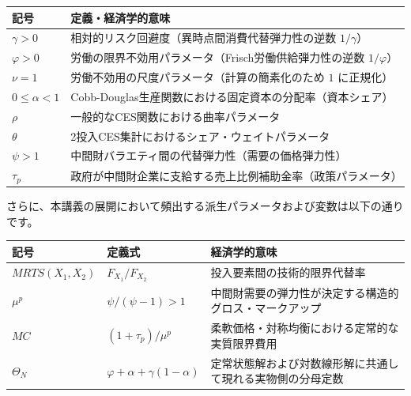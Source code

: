 \documentclass[
  japanese,
  lualatex,
  ja=standard,
  12pt,
  a4paper]{ltjsarticle}
\newcounter{none} %
\begin{document}
{\def\LTcaptype{none} %
\begin{longtable}[]{@{}
  >{\raggedright\arraybackslash}p{}
  >{\raggedright\arraybackslash}p{}@{}}
\toprule\noalign{}
\begin{minipage}[b]{\linewidth}\raggedright
記号
\end{minipage} & \begin{minipage}[b]{\linewidth}\raggedright
定義・経済学的意味
\end{minipage} \\
\midrule\noalign{}
\endhead
\bottomrule\noalign{}
\endlastfoot
\(\gamma > 0\) & 相対的リスク回避度（異時点間消費代替弾力性の逆数
\(1/\gamma\)） \\
\(\varphi > 0\) & 労働の限界不効用パラメータ（Frisch労働供給弾力性の逆数
\(1/\varphi\)） \\
\(\nu = 1\) & 労働不効用の尺度パラメータ（計算の簡素化のため \(1\)
に正規化） \\
\(0 \leq \alpha < 1\) &
Cobb-Douglas生産関数における固定資本の分配率（資本シェア） \\
\(\rho\) & 一般的なCES関数における曲率パラメータ \\
\(\theta\) & 2投入CES集計におけるシェア・ウェイトパラメータ \\
\(\psi > 1\) & 中間財バラエティ間の代替弾力性（需要の価格弾力性） \\
\(\tau_p\) &
政府が中間財企業に支給する売上比例補助金率（政策パラメータ） \\
\end{longtable}
}

さらに、本講義の展開において頻出する派生パラメータおよび変数は以下の通りです。

{\def\LTcaptype{none} %
\begin{longtable}[]{@{}
  >{\raggedright\arraybackslash}p{}
  >{\raggedright\arraybackslash}p{}
  >{\raggedright\arraybackslash}p{}@{}}
\toprule\noalign{}
\begin{minipage}[b]{\linewidth}\raggedright
記号
\end{minipage} & \begin{minipage}[b]{\linewidth}\raggedright
定義式
\end{minipage} & \begin{minipage}[b]{\linewidth}\raggedright
経済学的意味
\end{minipage} \\
\midrule\noalign{}
\endhead
\bottomrule\noalign{}
\endlastfoot
\(MRTS(X_1, X_2)\) & \(F_{X_1}/F_{X_2}\) &
投入要素間の技術的限界代替率 \\
\(\mu^p\) & \(\psi/(\psi-1) > 1\) &
中間財需要の弾力性が決定する構造的グロス・マークアップ \\
\(MC\) & \((1+\tau_p)/\mu^p\) &
柔軟価格・対称均衡における定常的な実質限界費用 \\
\(\Theta_N\) & \(\varphi+\alpha+\gamma(1-\alpha)\) &
定常状態解および対数線形解に共通して現れる実物側の分母定数 \\
\end{longtable}
}
\end{document}

